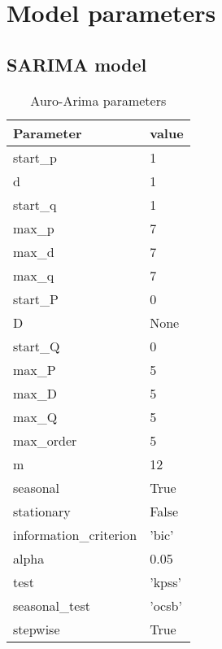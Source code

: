 \section{Model parameters}
\label{appendix:Model-Parameters}


\subsection{SARIMA model}

\begin{table}[h]
  \centering
  \caption{Auro-Arima parameters}
  \label{table:auto-arima-parameters}
  \begin{tabular}{|l|l|}\hline
    Parameter              & value   \\ \hline
    \hline
    start\_p               & 1       \\ \hline
    d                      & 1       \\ \hline
    start\_q               & 1       \\ \hline
    max\_p                 & 7       \\ \hline
    max\_d                 & 7       \\ \hline
    max\_q                 & 7       \\ \hline
    start\_P               & 0       \\ \hline
    D                      & None    \\ \hline
    start\_Q               & 0       \\ \hline
    max\_P                 & 5       \\ \hline
    max\_D                 & 5       \\ \hline
    max\_Q                 & 5       \\ \hline
    max\_order             & 5       \\ \hline
    m                      & 12      \\ \hline
    seasonal               & True    \\ \hline
    stationary             & False   \\ \hline
    information\_criterion & 'bic'   \\ \hline
    alpha                  & 0.05    \\ \hline
    test                   & 'kpss'  \\ \hline
    seasonal\_test         & 'ocsb'  \\ \hline
    stepwise               & True    \\ \hline

\end{tabular}
\end{table}
